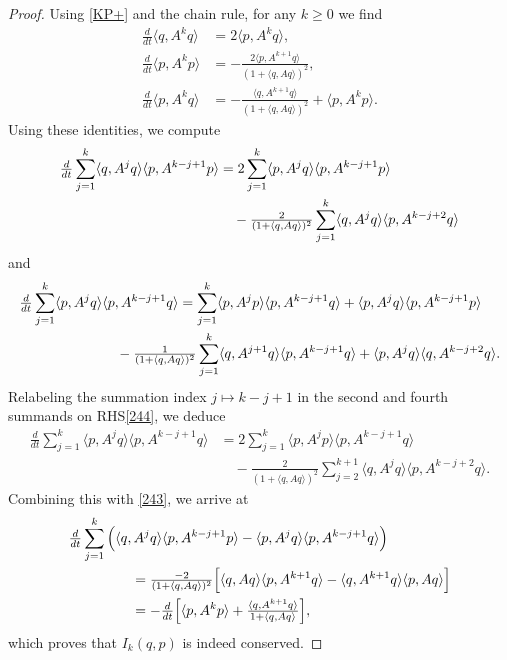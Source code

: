 \documentclass{amsart}
\theoremstyle{definition}
\numberwithin{equation}{section}
\newcommand{\la}{\langle}
\newcommand{\ra}{\rangle}
\begin{document}
\begin{proof}
Using \eqref{KP+} and the chain rule, for any $k\geq 0$ we find
\begin{align*}
\tfrac{d}{dt}\la q,A^kq \ra &=  2\la p, A^{k}q\ra,\\
\tfrac{d}{dt}\la p,A^kp \ra &= - \tfrac{2\la p, A^{k+1}q\ra}{(1+\la q, Aq \ra)^2},\\
\tfrac{d}{dt}\la p,A^kq \ra &= -\tfrac{\la q, A^{k+1}q\ra}{(1+\la q, Aq \ra)^2}+\la p, A^k p\ra.
\end{align*}
Using these identities, we compute
\begin{align}\label{243}
\tfrac{d}{dt}\sum_{j=1}^{k} \langle q, A^{j} q\rangle \langle p, A^{k-j+1} p\rangle
&= 2\sum_{j=1}^{k} \langle p, A^{j} q\rangle \langle p, A^{k-j+1} p\rangle \notag\\
&\quad - \tfrac{2}{(1+\la q, Aq \ra)^2}\sum_{j=1}^{k}\langle q, A^{j} q\rangle \langle p, A^{k-j+2} q\rangle
\end{align}
and
\begin{align}\label{244}
\tfrac{d}{dt}\sum_{j=1}^{k} \langle p, A^{j} q\rangle& \langle p, A^{k-j+1} q\rangle=\sum_{j=1}^{k}\la p, A^j p\ra\la p, A^{k-j+1} q\ra+\langle p, A^{j} q\rangle\la p, A^{k-j+1} p\ra\notag\\
&\quad-\tfrac{1}{(1+\la q, Aq \ra)^2}\sum_{j=1}^{k}\la q, A^{j+1}q\ra\la p, A^{k-j+1}q\ra+\langle p, A^{j} q\rangle\la q, A^{k-j+2} q\ra.
\end{align}
Relabeling the summation index $j\mapsto k-j+1$ in the second and fourth summands on RHS\eqref{244}, we deduce
\begin{align*}
\tfrac{d}{dt}\sum_{j=1}^{k} \langle p, A^{j} q\rangle \langle p, A^{k-j+1} q\rangle
&=2\sum_{j=1}^k\la p, A^j p\ra\la p, A^{k-j+1} q\ra\\
&\quad -\tfrac{2}{(1+\la q, Aq \ra)^2}\sum_{j=2}^{k+1}\la q, A^{j}q\ra\la p, A^{k-j+2} q\ra.
\end{align*}
Combining this with \eqref{243}, we arrive at
\begin{align*}
\tfrac{d}{dt} \sum_{j=1}^{k} \Big( \langle q, &\,A^{j} q\rangle \langle p, A^{k-j+1} p\rangle - \langle p, A^{j} q\rangle \langle p, A^{k-j+1} q\rangle \Big)\\
&= \tfrac{-2}{(1+\la q, Aq \ra)^2}\Bigl[\la q, Aq\ra \la p,A^{k+1}q\ra-\la q,A^{k+1}q\ra\la p,Aq\ra\Bigr]\\
&=-\tfrac{d}{dt}\Bigl[\langle p, A^{k} p\rangle + \tfrac{\langle q, A^{k+1} q\rangle}{1 + \langle q, A q\rangle} \Bigr],
\end{align*}
which proves that $I_k(q,p)$ is indeed conserved.


\end{proof}
\end{document}
